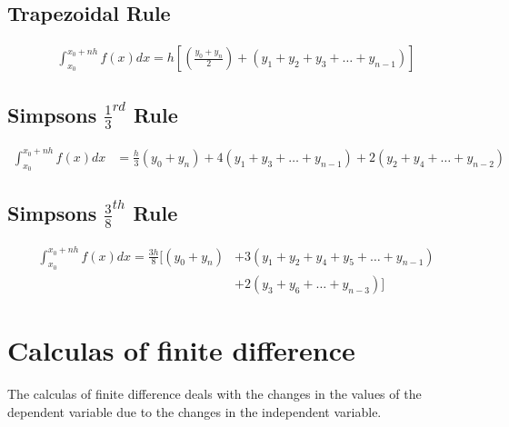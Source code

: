 \documentclass{article}
\begin{document}
{            %
            
            \subsection*{Trapezoidal Rule}
              \begin{align*}
                \int_{x_0}^{x_0+nh}f(x)dx = h[(\frac{y_0+y_n}{2})+(y_1+y_2+y_3+\dots+y_{n-1})]
              \end{align*}

            \subsection*{Simpsons $\frac{1}{3}^{rd}$ Rule}
              \begin{align*}
                \int_{x_0}^{x_0+nh}f(x)dx &= \frac{h}{3}(y_0+y_n)+4(y_1+y_3+\dots+y_{n-1})+2(y_2+y_4+\dots+y_{n-2})
              \end{align*}
            
            \subsection*{Simpsons $\frac{3}{8}^{th}$ Rule}
              \begin{align*}
                \int_{x_0}^{x_0+nh}f(x)dx=\frac{3h}{8}[(y_0+y_n) &+ 3(y_1+y_2+y_4+y_5+\dots+y_{n-1})\\
                                                                 &+ 2(y_3+y_6+\dots+y_{n-3})]
              \end{align*}
            
            }
            
            \newpage

            \section{Calculas of finite difference}
              The calculas of finite difference deals with the changes in the values of the 
              dependent variable due to the changes in the independent variable.
              
\end{document}
